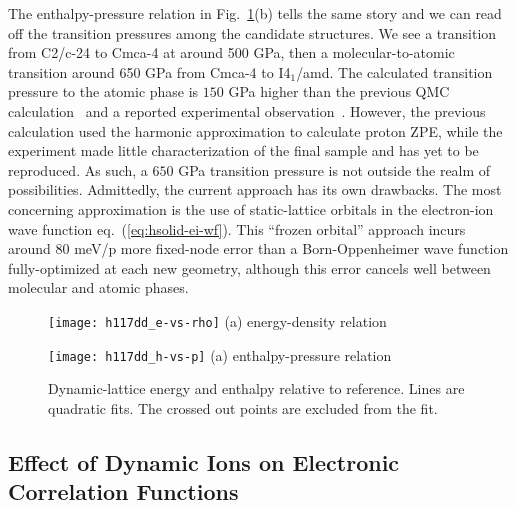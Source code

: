 The enthalpy-pressure relation in Fig.~\ref{fig:dynamic-qmc-vs-drummond}(b) tells the same story and we can read off the transition pressures among the candidate structures.
We see a transition from C2/c-24 to Cmca-4 at around 500 GPa, then a molecular-to-atomic transition around 650 GPa from Cmca-4 to I4$_1$/amd.
The calculated transition pressure to the atomic phase is $150$ GPa higher than the previous QMC calculation~\cite{McMinis2015} and a reported experimental observation~\cite{Silvera2017}.
However, the previous calculation used the harmonic approximation to calculate proton ZPE, while the experiment made little characterization of the final sample and has yet to be reproduced.
As such, a $650$ GPa transition pressure is not outside the realm of possibilities.
Admittedly, the current approach has its own drawbacks.
The most concerning approximation is the use of static-lattice orbitals in the electron-ion wave function eq.~(\ref{eq:hsolid-ei-wf}).
This ``frozen orbital'' approach incurs around $80$ meV/p more fixed-node error than a Born-Oppenheimer wave function fully-optimized at each new geometry, although this error cancels well between molecular and atomic phases.

\begin{figure}[h]
\begin{minipage}{0.49\textwidth}
\centering
\texttt{[image: h117dd\_e-vs-rho]}
(a) energy-density relation
\end{minipage}
\begin{minipage}{0.49\textwidth}
\centering
\texttt{[image: h117dd\_h-vs-p]}
(a) enthalpy-pressure relation
\end{minipage}
\caption{Dynamic-lattice energy and enthalpy relative to reference. Lines are quadratic fits. The crossed out points are excluded from the fit.}
\label{fig:dynamic-qmc-vs-drummond}
\end{figure}

\subsection{Effect of Dynamic Ions on Electronic Correlation Functions}

